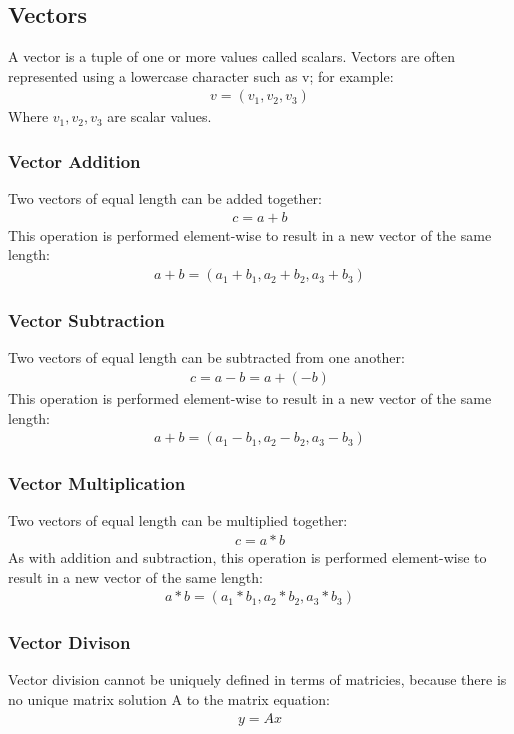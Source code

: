 \documentclass{article}
\begin{document}
\subsection{Vectors}
A vector is a tuple of one or more values called scalars. Vectors are often represented using a lowercase character such as v; for example:
\begin{align*}
v = (v_1, v_2, v_3)
\end{align*}
Where $v_1, v_2, v_3$ are scalar values.

\subsubsection{Vector Addition}
Two vectors of equal length can be added together:
\begin{align*}
c = a + b
\end{align*}
This operation is performed element-wise to result in a new vector of the same length:
\begin{align*}
a + b = (a_1 + b_1, a_2 + b_2, a_3 + b_3)
\end{align*}

\subsubsection{Vector Subtraction}
Two vectors of equal length can be subtracted from one another:
\begin{align*}
c = a - b = a + (-b)
\end{align*}
This operation is performed element-wise to result in a new vector of the same length:
\begin{align*}
a + b = (a_1 - b_1, a_2 - b_2, a_3 - b_3)
\end{align*}

\subsubsection{Vector Multiplication}
Two vectors of equal length can be multiplied together:
\begin{align*}
c = a * b
\end{align*}
As with addition and subtraction, this operation is performed element-wise to result in a new vector of the same length:
\begin{align*}
a * b = (a_1 * b_1, a_2 * b_2, a_3 * b_3)
\end{align*}

\subsubsection{Vector Divison}
Vector division cannot be uniquely defined in terms of matricies, because there is no unique matrix solution A to the matrix equation:
\begin{align*}
y = Ax
\end{align*}
\end{document}
